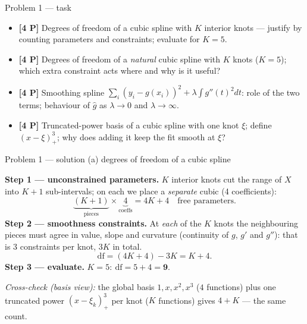 \documentclass[aspectratio=169,11pt]{beamer}
\begin{document}
\begin{frame}{Problem 1 --- task}
  \begin{exercise}
    \begin{itemize}
      \item[(a)] \textbf{[4 P]} Degrees of freedom of a cubic spline with $K$ interior knots ---
        justify by counting parameters and constraints; evaluate for $K=5$.
      \item[(b)] \textbf{[4 P]} Degrees of freedom of a \emph{natural} cubic spline with $K$ knots
        ($K=5$); which extra constraint acts where and why is it useful?
      \item[(c)] \textbf{[4 P]} Smoothing spline
        $\sum_i (y_i-g(x_i))^2+\lambda\int g''(t)^2dt$: role of the two terms;
        behaviour of $\hat g$ as $\lambda\to 0$ and $\lambda\to\infty$.
      \item[(d)] \textbf{[4 P]} Truncated-power basis of a cubic spline with one knot $\xi$;
        define $(x-\xi)^3_+$; why does adding it keep the fit smooth at $\xi$?
    \end{itemize}
  \end{exercise}
  \vspace{2pt}{\scriptsize\itshape Lecture slides: Chapter 7 --- Moving Beyond Linearity (Lecture 9).}
\end{frame}

\begin{frame}{Problem 1 --- solution (a) degrees of freedom of a cubic spline}
  \begin{solutionbox}
    \textbf{Step 1 --- unconstrained parameters.} $K$ interior knots cut the range of $X$ into
    $K+1$ sub-intervals; on each we place a \emph{separate} cubic (4 coefficients):
    \[
      \underbrace{(K+1)}_{\text{pieces}}\times\underbrace{4}_{\text{coeffs}}=4K+4
      \quad\text{free parameters.}
    \]
    \textbf{Step 2 --- smoothness constraints.} At \emph{each} of the $K$ knots the neighbouring
    pieces must agree in value, slope and curvature (continuity of $g$, $g'$ and $g''$): that is
    $3$ constraints per knot, $3K$ in total.
    \[
      \mathrm{df}=(4K+4)-3K=\boxed{K+4}.
    \]
    \textbf{Step 3 --- evaluate.} $K=5:\ \mathrm{df}=5+4=\mathbf{9}$.
    \medskip

    \emph{Cross-check (basis view):} the global basis $1,x,x^2,x^3$ ($4$ functions) plus one
    truncated power $(x-\xi_k)^3_+$ per knot ($K$ functions) gives $4+K$ --- the same count.
  \end{solutionbox}
\end{frame}
\end{document}
